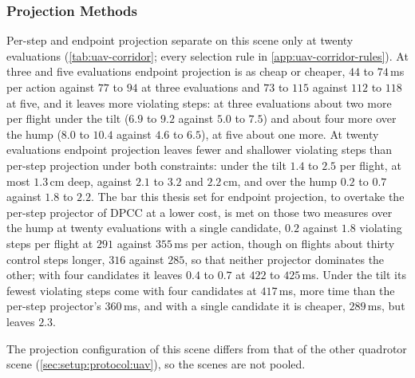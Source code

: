 \subsubsection{Projection Methods}\label{sec:res:uav:projection}
Per-step and endpoint projection separate on this scene only at twenty evaluations
(\autoref{tab:uav-corridor}; every selection rule in \autoref{app:uav-corridor-rules}). At three and five
evaluations endpoint projection is as cheap or cheaper, $44$ to $74$\,ms per action against $77$ to $94$ at
three evaluations and $73$ to $115$ against $112$ to $118$ at five, and it leaves more violating steps: at
three evaluations about two more per flight under the tilt ($6.9$ to $9.2$ against $5.0$ to $7.5$) and about
four more over the hump ($8.0$ to $10.4$ against $4.6$ to $6.5$), at five about one more. At twenty
evaluations endpoint projection leaves fewer and shallower violating steps than per-step projection under
both constraints: under the tilt $1.4$ to $2.5$ per flight, at most $1.3$\,cm deep, against $2.1$ to $3.2$
and $2.2$\,cm, and over the hump $0.2$ to $0.7$ against $1.8$ to $2.2$. The bar this thesis set for endpoint
projection, to overtake the per-step projector of \ac{DPCC} at a lower cost, is met on those two measures over
the hump at twenty evaluations with a single candidate, $0.2$ against $1.8$ violating steps per flight at $291$
against $355$\,ms per action, though on flights about thirty control steps longer, $316$ against $285$, so that
neither projector dominates the other; with four candidates it leaves $0.4$ to $0.7$ at $422$ to $425$\,ms. Under the tilt
its fewest violating steps come with four candidates at $417$\,ms, more time than the per-step projector's
$360$\,ms, and with a single candidate it is cheaper, $289$\,ms, but leaves $2.3$.


The projection configuration of this scene differs from that of the other quadrotor scene
(\autoref{sec:setup:protocol:uav}), so the scenes are not pooled.

